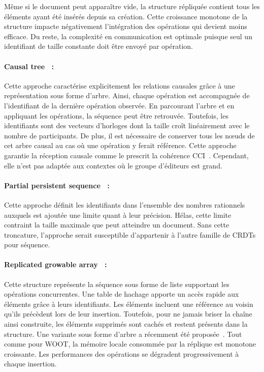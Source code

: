 \noindent Même si le document peut apparaître vide, la structure répliquée contient
tous les éléments ayant été insérés depuis sa création. Cette croissance
monotone de la structure impacte négativement l'intégration des opérations qui
devient moins efficace. Du reste, la complexité en communication est optimale
puisque seul un identifiant de taille constante doit être envoyé par opération.

\paragraph{Causal tree~\cite{grishchenko2010deep} :} Cette approche caractérise
explicitement les relations causales grâce à une représentation sous forme
d'arbre. Ainsi, chaque opération est accompagnée de l'identifiant de la dernière
opération observée. En parcourant l'arbre et en appliquant les opérations, la
séquence peut être retrouvée. Toutefois, les identifiants sont des vecteurs
d'horloges dont la taille croît linéairement avec le nombre de participants. De
plus, il est nécessaire de conserver tous les nœuds de cet arbre causal au cas
où une opération y ferait référence. Cette approche garantie la réception
causale comme le prescrit la cohérence CCI~\cite{sun1998achieving}. Cependant,
elle n'est pas adaptée aux contextes où le groupe d'éditeurs est grand.

\paragraph{Partial persistent sequence~\cite{wu2010partial} :} Cette approche
définit les identifiants dans l'ensemble des nombres rationnels auxquels est
ajoutée une limite quant à leur précision. Hélas, cette limite contraint la
taille maximale que peut atteindre un document. Sans cette troncature,
l'approche serait susceptible d'appartenir à l'autre famille de CRDTs pour
séquence.

\paragraph{Replicated growable array~\cite{roh2011replicated} :} Cette structure
représente la séquence sous forme de liste supportant les opérations
concurrentes. Une table de hachage apporte un accès rapide aux éléments grâce à
leurs identifiants. Les éléments incluent une référence au voisin qu'ils
précèdent lors de leur insertion. Toutefois, pour ne jamais briser la chaîne
ainsi construite, les éléments supprimés sont cachés et restent présents dans la
structure. Une variante sous forme d'arbre a récemment été
proposée~\cite{attiya2016specification}. Tout comme pour WOOT, la mémoire locale
consommée par la réplique est monotone croissante. Les performances des
opérations se dégradent progressivement à chaque insertion.


